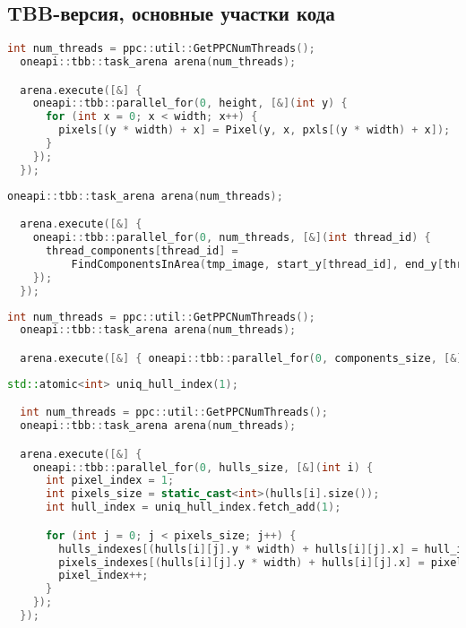 \documentclass[12pt]{article}
\begin{document}
\subsection{TBB-версия, основные участки кода}
\label{appendix:tbb_1}
\begin{lstlisting}[language=C++, caption={TBB-версия, Создание объекта Image в конструкторе Image::Image()}]
int num_threads = ppc::util::GetPPCNumThreads();
  oneapi::tbb::task_arena arena(num_threads);

  arena.execute([&] {
    oneapi::tbb::parallel_for(0, height, [&](int y) {
      for (int x = 0; x < width; x++) {
        pixels[(y * width) + x] = Pixel(y, x, pxls[(y * width) + x]);
      }
    });
  });
\end{lstlisting}
\label{appendix:tbb_2}
\begin{lstlisting}[language=C++, caption={TBB-версия, Поиск компонент по "полосам" изображения в функции FindComponentsTBB()}]
oneapi::tbb::task_arena arena(num_threads);

  arena.execute([&] {
    oneapi::tbb::parallel_for(0, num_threads, [&](int thread_id) {
      thread_components[thread_id] =
          FindComponentsInArea(tmp_image, start_y[thread_id], end_y[thread_id], index_offset[thread_id]);
    });
  });
\end{lstlisting}
\label{appendix:tbb_3}
\begin{lstlisting}[language=C++, caption={TBB-версия, Построение оболочки для каждой из компонент в функции QuickHullAllTBB()}]
  int num_threads = ppc::util::GetPPCNumThreads();
  oneapi::tbb::task_arena arena(num_threads);

  arena.execute([&] { oneapi::tbb::parallel_for(0, components_size, [&](int i) { hulls[i] = QuickHull(components[i]); }); });
\end{lstlisting}
\label{appendix:tbb_4}
\begin{lstlisting}[language=C++, caption={TBB-версия, Формирование единой структуры ответа в функции PackHulls()}]
std::atomic<int> uniq_hull_index(1);

  int num_threads = ppc::util::GetPPCNumThreads();
  oneapi::tbb::task_arena arena(num_threads);

  arena.execute([&] {
    oneapi::tbb::parallel_for(0, hulls_size, [&](int i) {
      int pixel_index = 1;
      int pixels_size = static_cast<int>(hulls[i].size());
      int hull_index = uniq_hull_index.fetch_add(1);

      for (int j = 0; j < pixels_size; j++) {
        hulls_indexes[(hulls[i][j].y * width) + hulls[i][j].x] = hull_index;
        pixels_indexes[(hulls[i][j].y * width) + hulls[i][j].x] = pixel_index;
        pixel_index++;
      }
    });
  });
\end{lstlisting}
\end{document}
